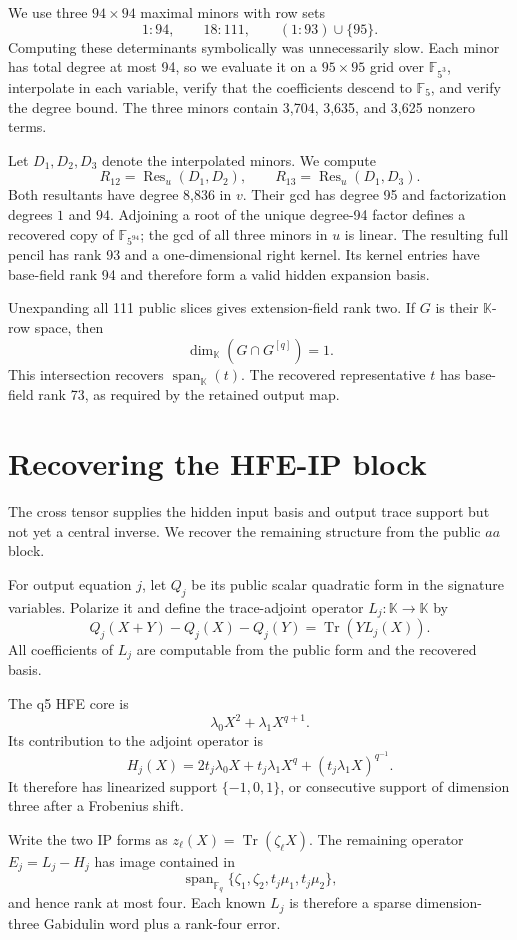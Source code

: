 \documentclass[10pt,a4paper]{article}
\newcommand{\F}{\mathbb{F}}
\newcommand{\K}{\mathbb{K}}
\newcommand{\Tr}{\operatorname{Tr}}
\newcommand{\Span}{\operatorname{span}}
\begin{document}
We use three $94\times94$ maximal minors with row sets
\[
  1{:}94,\qquad 18{:}111,\qquad (1{:}93)\cup\{95\}.
\]
Computing these determinants symbolically was unnecessarily slow.  Each
minor has total degree at most 94, so we evaluate it on a $95\times95$ grid
over $\F_{5^3}$, interpolate in each variable, verify that the coefficients
descend to $\F_5$, and verify the degree bound.  The three minors contain
3,704, 3,635, and 3,625 nonzero terms.

Let $D_1,D_2,D_3$ denote the interpolated minors.  We compute
\[
 R_{12}=\operatorname{Res}_u(D_1,D_2),\qquad
 R_{13}=\operatorname{Res}_u(D_1,D_3).
\]
Both resultants have degree 8,836 in $v$.  Their gcd has degree 95 and
factorization degrees $1$ and $94$.  Adjoining a root of the unique degree-94
factor defines a recovered copy of $\F_{5^{94}}$; the gcd of all three minors
in $u$ is linear.  The resulting full pencil has rank 93 and a one-dimensional
right kernel.  Its kernel entries have base-field rank 94 and therefore form
a valid hidden expansion basis.

Unexpanding all 111 public slices gives extension-field rank two.  If $G$ is
their $\K$-row space, then
\[
                    \dim_{\K}(G\cap G^{[q]})=1.
\]
This intersection recovers $\Span_{\K}(t)$.  The recovered representative
$t$ has base-field rank 73, as required by the retained output map.

\section{Recovering the HFE-IP block}

The cross tensor supplies the hidden input basis and output trace support but
not yet a central inverse.  We recover the remaining structure from the
public $aa$ block.

For output equation $j$, let $Q_j$ be its public scalar quadratic form in the
signature variables.  Polarize it and define the trace-adjoint operator
$L_j:\K\to\K$ by
\[
 Q_j(X+Y)-Q_j(X)-Q_j(Y)=\Tr(YL_j(X)).
\]
All coefficients of $L_j$ are computable from the public form and the
recovered basis.

The q5 HFE core is
\[
                  \lambda_0X^2+\lambda_1X^{q+1}.
\]
Its contribution to the adjoint operator is
\[
 H_j(X)=2t_j\lambda_0X+t_j\lambda_1X^q+
        (t_j\lambda_1X)^{q^{-1}}.
\]
It therefore has linearized support $\{-1,0,1\}$, or consecutive support of
dimension three after a Frobenius shift.

Write the two IP forms as $z_\ell(X)=\Tr(\zeta_\ell X)$.  The remaining
operator $E_j=L_j-H_j$ has image contained in
\[
 \Span_{\F_q}\{\zeta_1,\zeta_2,t_j\mu_1,t_j\mu_2\},
\]
and hence rank at most four.  Each known $L_j$ is therefore a sparse
dimension-three Gabidulin word plus a rank-four error.
\end{document}
